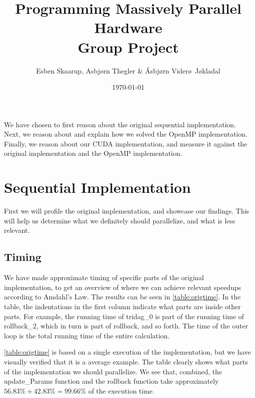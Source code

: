 \documentclass[11pt]{article}
\def\Title{Programming Massively Parallel Hardware\\
\vspace{1.5cm}
\textbf{Group Project}}
\def\Author{Esben Skaarup, Asbj\o rn Thegler \& \'{A}sbj\o rn Vider\o \ J\o kladal}
\begin{document}
\title{\Title}
\author{\Author}
\date{\today}
\maketitle

We have chosen to first reason about the original sequential implementation. 
Next, we reason about and explain how we solved the OpenMP 
implementation. Finally, we reason about our CUDA implementation, and measure
it against the original implementation and the OpenMP implementation.

\section{Sequential Implementation}
First we will profile the original implementation, and showcase our findings.
This will help us determine what we definitely should parallelize, and what is
less relevant.

\subsection{Timing}
We have made approximate timing of specific parts of the original 
implementation, to get an overview 
of where we can achieve relevant speedups according to Amdahl's Law. The results
can be seen in \autoref{table:origtime}. In the table, the indentations 
in the first column indicate what parts are inside other parts. For example,
the running time of tridag\_0 is part of the running time of rollback\_2, which
in turn is part of rollback, and so forth. The time of the outer loop is the 
total running time of the entire calculation. 

\autoref{table:origtime} is based on a single execution of the implementation, 
but we have visually verified that it is a average example. 
The table clearly shows what parts of the implementation we should parallelize.
We see that, combined, the update\_Params function and the rollback function take approximately $56.83\%+42.83\%=99.66\%$ of the execution time.
\end{document}
